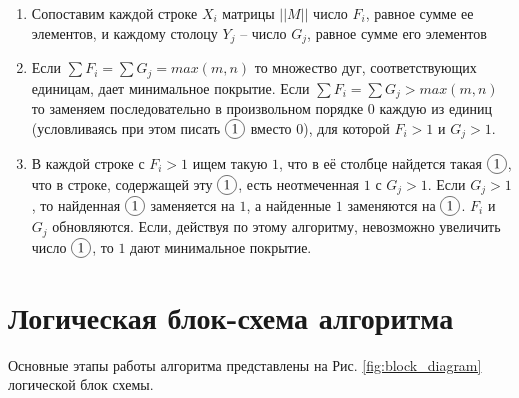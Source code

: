 \documentclass[12pt]{article}
\newcommand*\circled[1]{\tikz[baseline=(char.base)]{
            \node[shape=circle,draw,inner sep=2pt] (char) {#1};}}
\begin{document}
\begin{enumerate}
    \item Сопоставим каждой строке $X_i$ матрицы $||M||$
          число $F_i$, равное сумме ее элементов,
          и каждому столоцу $Y_j$ – число $G_j$, равное сумме
          его элементов
    \item Если $\sum F_i = \sum G_j = max(m, n)$ то
          множество дуг, соответствующих единицам,
          дает минимальное покрытие. Если
          $\sum F_i = \sum G_j > max(m, n)$
          то заменяем последовательно
          в произвольном порядке $0$ каждую из единиц
          (условливаясь при этом писать $\circled{1}$ вместо $0$),
          для которой $F_i > 1$ и $G_j > 1$.
    \item В каждой строке с $F_i > 1$ ищем такую
          $1$, что в её столбце найдется
          такая $\circled{1}$, что в строке,
          содержащей эту $\circled{1}$, есть неотмеченная $1$
          с $G_j > 1$. Если $G_j > 1$, то найденная $\circled{1}$
          заменяется на $1$, а найденные $1$ заменяются на
          $\circled{1}$. $F_i$ и $G_j$ обновляются.
          Если, действуя по этому алгоритму,
          невозможно увеличить число $\circled{1}$,
          то $1$ дают минимальное покрытие.
\end{enumerate}

\section{Логическая блок-схема алгоритма}

Основные этапы работы алгоритма представлены на
Рис. \ref*{fig:block_diagram} логической блок
схемы.
\end{document}
